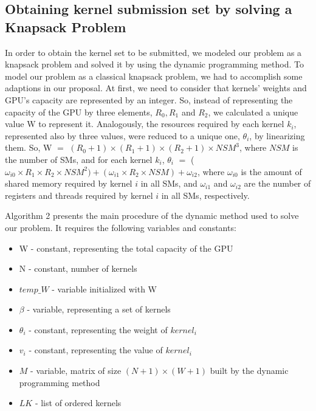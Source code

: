 
\subsection{Obtaining  kernel submission set by solving a Knapsack Problem} 

In order to obtain the kernel set  to be submitted,  we modeled our problem as a knapsack problem  and solved it by using the  dynamic programming method. 
To model our problem as a  classical knapsack problem, we had to accomplish some adaptions in our proposal. At first, we need to  consider that  kernels' weights and GPU's capacity are represented by an integer.  So, instead of representing the capacity of the  GPU by  three elements, $R_0, R_1$ and $R_2$, we calculated  a unique value W to represent it. Analogously,  the resources required by each  kernel $k_i$, represented also  by three values, were reduced to a unique one, $\theta _i$, by linearizing them. So, W  $=$  $(R_0 + 1)\times (R_1 +1) \times (R_2 +1) \times NSM^3$,  where $NSM$ is the number of SMs, and for each kernel $k_i$,
  $\theta_i$ $=$ ($\omega_{i0} \times R_1 \times R_2 \times NSM^2) + (\omega_{i1} \times R_2 \times NSM) + \omega_{i2}$, where  $\omega_{i0}$  is the amount of shared memory required by  kernel $i$ in all SMs, and  $\omega_{i1}$ and  $\omega_{i2}$ are the number of registers and threads  required by   kernel $i$ in all SMs, respectively.

Algorithm 2 presents the main procedure of the dynamic method used to solve our problem. It requires the  following variables and constants:

 \begin{itemize}
      \item W - constant, representing the total capacity of the GPU 
      \item N - constant, number of kernels
      \item $temp\_W$ -    variable initialized with  W
      \item  $\beta$ -  variable, representing a set of kernels
 \item $\theta_i$ -  constant,  representing the weight of $kernel_i$
 \item $v_i$ - constant, representing the value of   $kernel_i$
 \item $M$ -  variable,  matrix of size $(N+1)\times (W+1)$ built by the dynamic programming method
     \item  $LK$ - list of ordered kernels
  \end{itemize}
  
